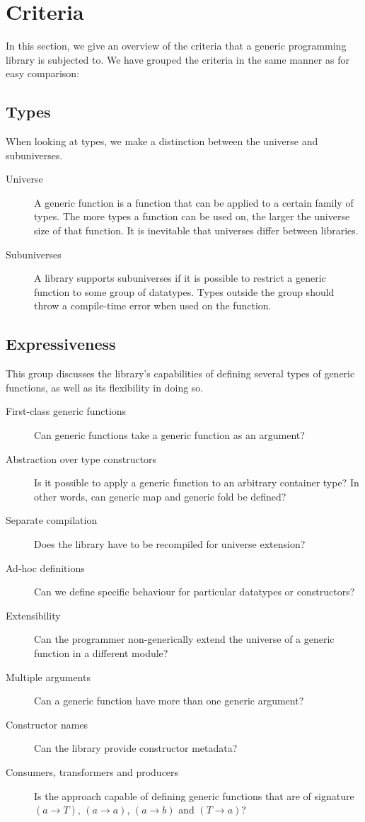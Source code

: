 \documentclass[twocolumn,11pt,a4paper]{article}
\begin{document}
\section{Criteria}\label{criteria}

In this section, we give an overview of the criteria that a generic programming library is subjected to. We have grouped the criteria in the same manner as \citet{Rodriguez:2008:art} for easy comparison:

\subsection{Types}
When looking at types, we make a distinction between the universe and subuniverses. 
\begin{description}
\item[Universe] A generic function is a function that can be applied to a certain family of types. 
The more types a function can be used on, the larger the universe size of that function.
It is inevitable that universes differ between libraries.
\item[Subuniverses]
A library supports subuniverses if it is possible to restrict a generic function to some group of datatypes.
Types outside the group should throw a compile-time error when used on the function.
\end{description}

\subsection{Expressiveness}

This group discusses the library's capabilities of defining several types of generic functions, as well as its flexibility in doing so.

\begin{description}
\item[First-class generic functions] 
Can generic functions take a generic function as an argument?
\item[Abstraction over type constructors] 
Is it possible to apply a generic function to an arbitrary container type? In other words, can generic map and generic fold be defined?
\item[Separate compilation] 
Does the library have to be recompiled for universe extension?
\item[Ad-hoc definitions] 
Can we define specific behaviour for particular datatypes or constructors?
\item[Extensibility] 
Can the programmer non-generically extend the universe of a generic function in a different module?
\item[Multiple arguments] Can a generic function have more than one generic argument?
\item[Constructor names] Can the library provide constructor metadata?
\item[Consumers, transformers and producers] 
Is the approach capable of defining generic functions that are of signature $ (a \rightarrow T) $, $ (a \rightarrow a) $, $ (a \rightarrow b) $ and $ (T \rightarrow a) $?
\end{description}
\end{document}
